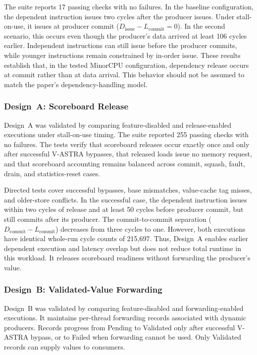 The suite reports 17
passing checks with no failures. In the baseline configuration, the
dependent instruction issues two cycles after the producer issues.
Under stall-on-use, it issues at producer commit
(\(D_{\mathrm{issue}}-L_{\mathrm{commit}}=0\)). In the second
scenario, this occurs even though the producer's data arrived at least
106 cycles earlier. Independent instructions can still issue before
the producer commits, while younger instructions remain constrained
by in-order issue. These results establish that, in the tested MinorCPU
configuration, dependency release occurs at commit rather than at
data arrival. This behavior should not be assumed to match the
paper's dependency-handling model.

\subsubsection{Design~A: Scoreboard Release}
\label{subsubsec:scoreboard-release-validation}

Design~A was validated by comparing feature-disabled and
release-enabled executions under stall-on-use timing.
The suite reported 255 passing checks with no failures. The tests
verify that scoreboard releases occur exactly once and only after
successful V-ASTRA bypasses, that released loads issue no memory
request, and that scoreboard accounting remains balanced across
commit, squash, fault, drain, and statistics-reset cases.

Directed tests cover successful bypasses, base mismatches, value-cache
tag misses, and older-store conflicts. In the successful case, the
dependent instruction issues within two cycles of release and at
least 50 cycles before producer commit, but still commits after its
producer. The commit-to-commit separation
(\(D_{\mathrm{commit}}-L_{\mathrm{commit}}\)) decreases from three
cycles to one. However, both executions have identical whole-run
cycle counts of 215,697. Thus, Design~A enables earlier dependent
execution and latency overlap but does not reduce total runtime in
this workload. It releases scoreboard readiness without forwarding
the producer's value.

\subsubsection{Design~B: Validated-Value Forwarding}
\label{subsubsec:validated-value-forwarding-validation}

Design~B was validated by comparing feature-disabled and
forwarding-enabled executions.
It maintains per-thread forwarding records associated with dynamic
producers. Records progress from Pending to Validated only after
successful V-ASTRA bypass, or to Failed when forwarding cannot be
used. Only Validated records can supply values to consumers.

